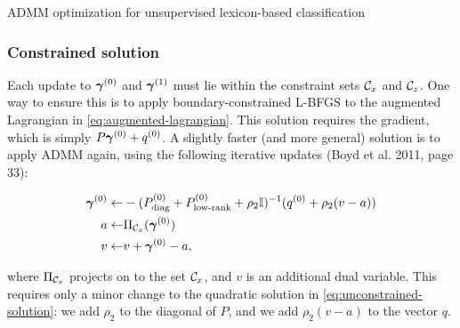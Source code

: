 \begin{algorithm}[t!]
\begin{algorithmic}
\EndWhile
{}
\EndWhile
{}
\EndWhile
\end{algorithmic}
\caption{ADMM optimization for unsupervised lexicon-based classification}
\label{alg:optimization}
\end{algorithm}

\subsubsection{Constrained solution}
Each update to $\bm{\gamma}^{(0)}$ and $\bm{\gamma}^{(1)}$ must lie within the constraint sets $\mathcal{C}_x$ and $\mathcal{C}_z$. One way to ensure this is to apply boundary-constrained L-BFGS to the augmented Lagrangian in \autoref{eq:augmented-lagrangian}. This solution requires the gradient, which is simply $P \bm{\gamma}^{(0)} + q^{(0)}$. A slightly faster (and more general) solution is to apply ADMM again, using the following iterative updates (Boyd et al. 2011, page 33):
\begin{small}
\begin{align}
\bm{\gamma}^{(0)} \gets & -(P^{(0)}_{\text{diag}} + P^{(0)}_{\text{low-rank}} + \rho_2 \mathbb{I})^{-1} (q^{(0)} + \rho_2(v-a))\\
a \gets & \Pi_{\mathcal{C}_x}(\bm{\gamma}^{(0)})\\
v \gets & v + \bm{\gamma}^{(0)} - a,
\end{align}
\end{small}
where $\Pi_{\mathcal{C}_x}$ projects on to the set $\mathcal{C}_x$, and $v$ is an additional dual variable. This requires only a minor change to the quadratic solution in \autoref{eq:unconstrained-solution}: we add $\rho_2$ to the diagonal of $P$, and we add $\rho_2 (v - a)$ to the vector $q$. 

